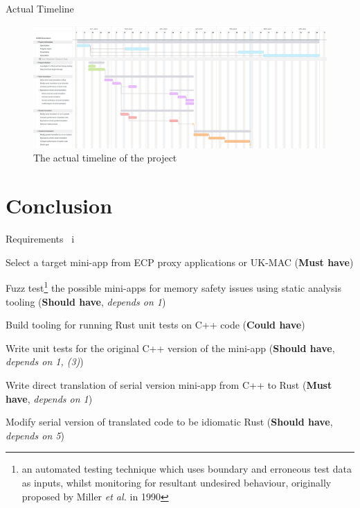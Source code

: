 \documentclass[10pt,aspectratio=169]{beamer}
\newcommand{\cmark}{\ding{51}}%
\newcommand{\done}{\rlap{$\square$}{\raisebox{2pt}{\large\hspace{1pt}\cmark}}%
\hspace{-2.5pt}}
\begin{document}
\begin{frame}{Actual Timeline}
    \begin{figure}[h]
        \centering
        \includegraphics[width=\textwidth]{images/actual_gantt_chart.png}
        \caption{The actual timeline of the project}
        \label{fig:actual_gantt_chart}
    \end{figure}
\end{frame}



\section{Conclusion}

\begin{frame}{Requirements \ i}
    \begin{todolist}
        \item[\done\ \ 1.]
          Select a target mini-app from ECP proxy applications or UK-MAC
          (\textbf{Must have})
        \item[\done\ \ 2.]
          Fuzz test\footnote{an automated testing technique which uses boundary and erroneous test data as inputs, whilst monitoring for resultant undesired behaviour, originally proposed by Miller \textit{et al.} in 1990\cite{millerEmpiricalStudyReliability1990}\cite{liangFuzzingStateArt2018}} the possible mini-apps for memory safety issues using static analysis tooling \cite{stepanovMemorySanitizerFastDetector2015}
          (\textbf{Should have}, \textit{depends on 1})
        \item[\done\ \ 3.]
          Build tooling for running Rust unit tests on C++ code
          (\textbf{Could have})
        \item[\done\ \ 4.]
          Write unit tests for the original C++ version of the
          mini-app
          (\textbf{Should have}, \textit{depends on 1, (3)})
        \item[\done\ \ 5.]
          Write direct translation of serial version mini-app from C++ to Rust
          (\textbf{Must have}, \textit{depends on 1})
        \item[\done\ \ 6.]
          Modify serial version of translated code to be idiomatic Rust \cite{endlerMreIdiomaticrust2023} 
          (\textbf{Should have}, \textit{depends on 5})
    \end{todolist}
\end{frame}
\end{document}
